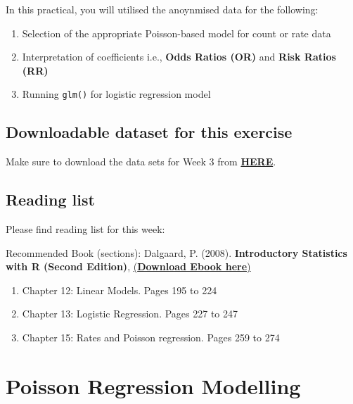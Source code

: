 \documentclass[
]{book}
\providecommand{\tightlist}{%
  \setlength{\itemsep}{0pt}\setlength{\parskip}{0pt}}
\begin{document}
In this practical, you will utilised the anoynmised data for the following:

\begin{enumerate}
\def\labelenumi{\arabic{enumi}.}
\tightlist
\item
  Selection of the appropriate Poisson-based model for count or rate data
\item
  Interpretation of coefficients i.e., \textbf{Odds Ratios (OR)} and \textbf{Risk Ratios (RR)}
\item
  Running \texttt{glm()} for logistic regression model
\end{enumerate}

\hypertarget{downloadable-dataset-for-this-exercise-2}{%
\subsection{Downloadable dataset for this exercise}\label{downloadable-dataset-for-this-exercise-2}}

Make sure to download the data sets for Week 3 from \href{https://github.com/UCLPG-MSC-SGDS/GEOG0125/raw/main/Dataset.zip}{\textbf{HERE}}.

\hypertarget{reading-list-2}{%
\subsection{Reading list}\label{reading-list-2}}

Please find reading list for this week:

Recommended Book (sections): Dalgaard, P. (2008). \textbf{Introductory Statistics with R (Second Edition)}, \href{https://link.springer.com/book/10.1007/978-0-387-79054-1}{(\textbf{Download Ebook here})}

\begin{enumerate}
\def\labelenumi{\arabic{enumi}.}
\item
  Chapter 12: Linear Models. Pages 195 to 224
\item
  Chapter 13: Logistic Regression. Pages 227 to 247
\item
  Chapter 15: Rates and Poisson regression. Pages 259 to 274
\end{enumerate}

\hypertarget{poisson-regression-modelling}{%
\section{Poisson Regression Modelling}\label{poisson-regression-modelling}}
\end{document}

